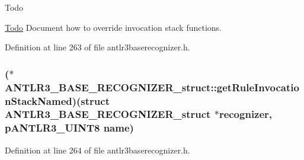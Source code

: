 \begin{DoxyRefDesc}{Todo}
\item[\hyperlink{todo__todo000001}{Todo}]Document how to override invocation stack functions. \end{DoxyRefDesc}


Definition at line 263 of file antlr3baserecognizer.\-h.

\hypertarget{struct_a_n_t_l_r3___b_a_s_e___r_e_c_o_g_n_i_z_e_r__struct_af41a93209d8c94ba9dc063f6d3492ca4}{
\subsubsection[{get\-Rule\-Invocation\-Stack\-Named}]{($\ast$ A\-N\-T\-L\-R3\-\_\-\-B\-A\-S\-E\-\_\-\-R\-E\-C\-O\-G\-N\-I\-Z\-E\-R\-\_\-struct\-::get\-Rule\-Invocation\-Stack\-Named)(struct {\bf A\-N\-T\-L\-R3\-\_\-\-B\-A\-S\-E\-\_\-\-R\-E\-C\-O\-G\-N\-I\-Z\-E\-R\-\_\-struct} $\ast${\bf recognizer}, {\bf p\-A\-N\-T\-L\-R3\-\_\-\-U\-I\-N\-T8} {\bf name})}}\label{struct_a_n_t_l_r3___b_a_s_e___r_e_c_o_g_n_i_z_e_r__struct_af41a93209d8c94ba9dc063f6d3492ca4}


Definition at line 264 of file antlr3baserecognizer.\-h.

